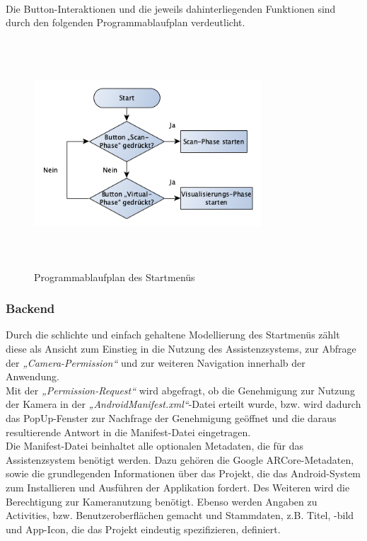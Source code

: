\\
Die Button-Interaktionen und die jeweils dahinterliegenden Funktionen sind durch den folgenden Programmablaufplan verdeutlicht. 
\begin{figure}[hbt!]
    \centering
    \includegraphics[width=8.5cm,height=8.5cm,keepaspectratio]{4Umsetzung/Bilder/startPAP.png}
    \caption{Programmablaufplan des Startmenüs}
    \label{pic:startmenu}
\end{figure}
\pagebreak
\subsubsection{Backend}
Durch die schlichte und einfach gehaltene Modellierung des Startmenüs zählt diese als Ansicht zum Einstieg in die Nutzung des Assistenzsystems, zur Abfrage der 
\textit{„Camera-Permission“} und zur weiteren Navigation innerhalb der Anwendung.
\\ 
Mit der \textit{„Permission-Request“} wird abgefragt, ob die Genehmigung zur Nutzung der Kamera in der \textit{„AndroidManifest.xml“}-Datei erteilt wurde, bzw. 
wird dadurch das PopUp-Fenster zur Nachfrage der Genehmigung geöffnet und die daraus resultierende Antwort in die Manifest-Datei eingetragen. 
\\ 
\linebreak
Die Manifest-Datei beinhaltet alle optionalen Metadaten, die für das Assistenzsystem benötigt werden. Dazu gehören die Google ARCore-Metadaten, sowie die 
grundlegenden Informationen über das Projekt, die das Android-System zum Installieren und Ausführen der Applikation fordert. Des Weiteren wird 
die Berechtigung zur Kameranutzung benötigt. Ebenso werden Angaben zu Activities, bzw. Benutzeroberflächen gemacht und Stammdaten, z.B. Titel, -bild und 
App-Icon, die das Projekt eindeutig spezifizieren, definiert.

